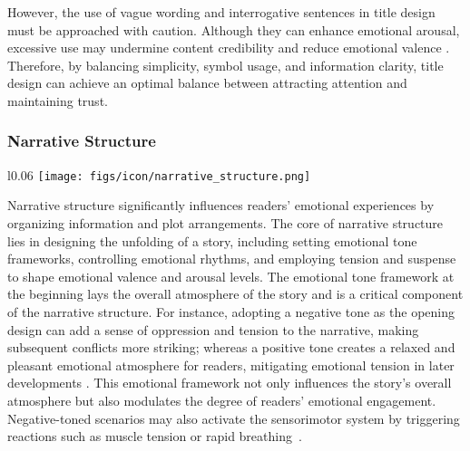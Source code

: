 However, the use of vague wording and interrogative sentences in title design must be approached with caution. Although they can enhance emotional arousal, excessive use may undermine content credibility and reduce emotional valence \cite{kuiken2017effective}. Therefore, by balancing simplicity, symbol usage, and information clarity, title design can achieve an optimal balance between attracting attention and maintaining trust.


\subsubsection{Narrative Structure}

\begin{wrapfigure}{l}{0.06\textwidth}
  \vspace{-11pt} %
    \texttt{[image: figs/icon/narrative\_structure.png]}
\end{wrapfigure} 

Narrative structure significantly influences readers’ emotional experiences by organizing information and plot arrangements. The core of narrative structure lies in designing the unfolding of a story, including setting emotional tone frameworks, controlling emotional rhythms, and employing tension and suspense to shape emotional valence and arousal levels. The emotional tone framework at the beginning lays the overall atmosphere of the story and is a critical component of the narrative structure. For instance, adopting a negative tone as the opening design can add a sense of oppression and tension to the narrative, making subsequent conflicts more striking; whereas a positive tone creates a relaxed and pleasant emotional atmosphere for readers, mitigating emotional tension in later developments \cite{mar2011emotion}. This emotional framework not only influences the story’s overall atmosphere but also modulates the degree of readers’ emotional engagement. Negative-toned scenarios may also activate the sensorimotor system by triggering reactions such as muscle tension or rapid breathing~\cite{james1884mind, panksepp2012archeology}.


